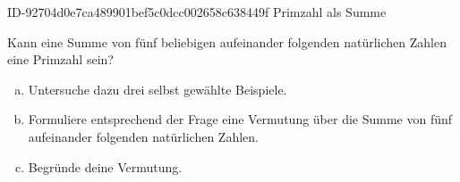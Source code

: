 \begin{exercise}
      {ID-92704d0e7ca489901bef5c0dcc002658c638449f}
      {Primzahl als Summe}
  \ifproblem\problem\par
    Kann eine Summe von fünf beliebigen aufeinander folgenden natürlichen
    Zahlen eine Primzahl sein?
    \begin{enumerate}[a)]
      \item Untersuche dazu drei selbst gewählte Beispiele.
      \item Formuliere entsprechend der Frage eine Vermutung über die Summe
            von fünf aufeinander folgenden natürlichen Zahlen.
      \item Begründe deine Vermutung.
    \end{enumerate}
  \fi
\end{exercise}

